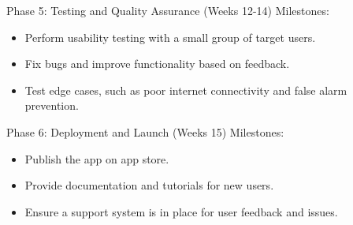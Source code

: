 \documentclass{article} %
\begin{document}
Phase 5: Testing and Quality Assurance (Weeks 12-14)
Milestones:
\begin{itemize}
\item Perform usability testing with a small group of target users.
\item Fix bugs and improve functionality based on feedback.
\item Test edge cases, such as poor internet connectivity and false alarm prevention.
\end{itemize}

Phase 6: Deployment and Launch (Weeks 15)
Milestones:
\begin{itemize}
\item Publish the app on app store.
\item Provide documentation and tutorials for new users.
\item Ensure a support system is in place for user feedback and issues.
\end{itemize}








%
\end{document}
